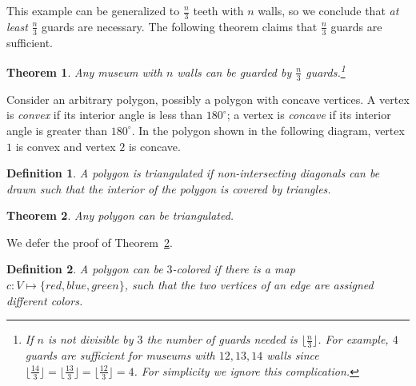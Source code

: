 \documentclass[11pt,a4paper]{article}
\newtheorem{theorem}{Theorem}
\newtheorem{definition}{Definition}
\begin{document}
This example can be generalized to $\frac{n}{3}$ teeth with $n$ walls, so we conclude that \emph{at least} $\frac{n}{3}$ guards are necessary. The following theorem claims that $\frac{n}{3}$ guards are sufficient.

\begin{theorem}\label{thm.guarded} Any museum with $n$ walls can be guarded by $\frac{n}{3}$ guards.\footnote{If $n$ is not divisible by $3$ the number of guards needed is $\lfloor \frac{n}{3}\rfloor$. For example, $4$ guards are sufficient for museums with $12, 13, 14$ walls since $\lfloor \frac{14}{3}\rfloor =\lfloor \frac{13}{3}\rfloor=\lfloor \frac{12}{3}\rfloor=4$. For simplicity we ignore this complication.}
\end{theorem}

Consider an arbitrary polygon, possibly a polygon with concave vertices. A vertex is \emph{convex} if its interior angle is less than $180^\circ$; a vertex is \emph{concave} if its interior angle is greater than $180^\circ$. In the polygon shown in the following diagram, vertex $1$ is convex and vertex $2$ is concave.

\begin{center}
\end{center}

\begin{definition} A polygon is triangulated if \emph{non-intersecting diagonals} can be drawn such that the interior of the polygon is covered by triangles.
\end{definition}

\begin{theorem}
Any polygon can be triangulated.\label{thm.tri}
\end{theorem}

We defer the proof of Theorem~\ref{thm.tri}.

\begin{definition}
A polygon can be \emph{$3$-colored} if there is a map $c: V \mapsto \{\mathit{red},\mathit{blue},\mathit{green}\}$, such that the two vertices of an edge are assigned different colors.
\end{definition}
\end{document}
